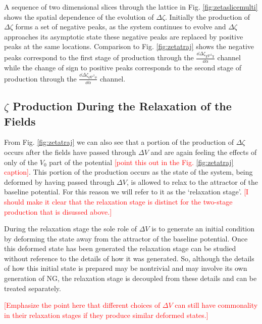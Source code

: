A sequence of two dimensional slices through the lattice in Fig. \ref{fig:zetaslicemulti} shows the spatial dependence of the evolution of $\Delta\zeta$. Initially the production of $\Delta\zeta$ forms a set of negative peaks, as the system continues to evolve and $\Delta\zeta$ approaches its asymptotic state these negative peaks are replaced by positive peaks at the same locations. Comparison to Fig. \ref{fig:zetatraj} shows the negative peaks correspond to the first stage of production through the $\frac{\dd\Delta\zeta_{\dot{\chi}\nabla^2\chi}}{\dd\alpha}$ channel while the change of sign to positive peaks corresponds to the second stage of production through the $\frac{\dd\Delta\zeta_{\dot{\phi}\nabla^2\phi}}{\dd\alpha}$ channel.

\subsection{$\zeta$ Production During the Relaxation of the Fields}
From Fig. \ref{fig:zetatraj} we can also see that a portion of the production of $\Delta\zeta$ occurs after the fields have passed through $\Delta V$ and are again feeling the effects of only of the $V_0$ part of the potential \textcolor{red}{[point this out in the Fig. \ref{fig:zetatraj} caption]}. This portion of the production occurs as the state of the system, being deformed by having passed through $\Delta V$, is allowed to relax to the attractor of the baseline potential. For this reason we will refer to it as the `relaxation stage'. \textcolor{red}{[I should make it clear that the relaxation stage is distinct for the two-stage production that is disussed above.]}

During the relaxation stage the sole role of $\Delta V$ is to generate an initial condition by deforming the state away from the attractor of the baseline potential. Once this deformed state has been generated the relaxation stage can be studied without reference to the details of how it was generated. So, although the details of how this initial state is prepared may be nontrivial and may involve its own generation of NG, the relaxation stage is decoupled from these details and can be treated separately.

\textcolor{red}{[Emphasize the point here that different choices of $\Delta V$ can still have commonality in their relaxation stages if they produce similar deformed states.]}


